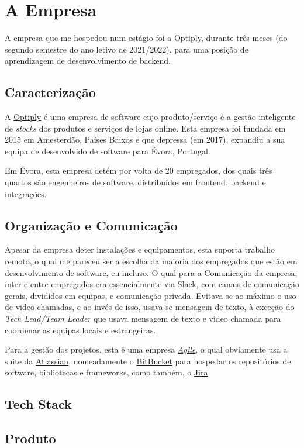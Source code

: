 \chapter{A Empresa}
\label{cap2}

A empresa que me hospedou num estágio foi a \href{https://optiply.nl/}{Optiply}, durante três meses (do segundo semestre do ano letivo de 2021/2022), para uma posição de aprendizagem de desenvolvimento de backend.

\section{Caracterização}

A \href{https://optiply.nl/}{Optiply} é uma empresa de software cujo produto/serviço é a gestão inteligente de \textit{stocks} dos produtos e serviços de lojas online. Esta empresa foi fundada em 2015 em Amesterdão, Países Baixos e que depressa (em 2017), expandiu a sua equipa de desenvolvido de software para Évora, Portugal.

Em Évora, esta empresa detém por volta de 20 empregados, dos quais três quartos são engenheiros de software, distribuídos em frontend, backend e integrações.

\section{Organização e Comunicação}

Apesar da empresa deter instalações e equipamentos, esta suporta trabalho remoto, o qual me pareceu ser a escolha da maioria dos empregados que estão em desenvolvimento de software, eu incluso. O qual para a Comunicação da empresa, inter e entre empregados era essencialmente via Slack, com canais de comunicação gerais, divididos em equipas, e comunicação privada. Evitava-se ao máximo o uso de video chamadas, e ao invés de isso, usava-se mensagem de texto, à exceção do \textit{Tech Lead/Team Leader} que usava mensagem de texto e video chamada para coordenar as equipas locais e estrangeiras.

Para a gestão dos projetos, esta é uma empresa \href{https://www.atlassian.com/agile}{\textit{Agile}}, o qual obviamente usa a suite da \href{https://www.atlassian.com/}{Atlassian}, nomeadamente o \href{https://bitbucket.org/}{BitBucket} para hospedar os repositórios de software, bibliotecas e frameworks, como também, o \href{https://jira.atlassian.com/}{Jira}.

\section{Tech Stack}

\lipsum

\section{Produto}

\lipsum
